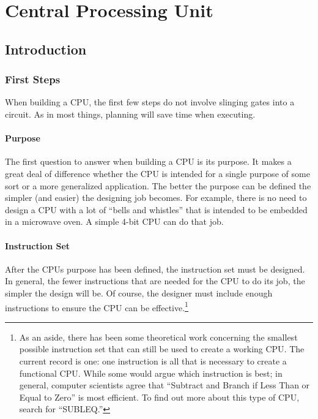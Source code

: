 \chapter{Central Processing Unit}\label{lab12}

\section{Introduction}

\subsection{First Steps}

When building a \ac{CPU}, the first few steps do not involve slinging gates into a circuit. As in most things, planning will save time when executing.

\subsubsection{Purpose}

The first question to answer when building a \ac{CPU} is its purpose. It makes a great deal of difference whether the \ac{CPU} is intended for a single purpose of some sort or a more generalized application. The better the purpose can be defined the simpler (and easier) the designing job becomes. For example, there is no need to design a \ac{CPU} with a lot of ``bells and whistles'' that is intended to be embedded in a microwave oven. A simple 4-bit \ac{CPU} can do that job.

\subsubsection{Instruction Set}

After the \acp{CPU} purpose has been defined, the instruction set must be designed. In general, the fewer instructions that are needed for the \ac{CPU} to do its job, the simpler the design will be. Of course, the designer must include enough instructions to ensure the \ac{CPU} can be effective.\footnote{As an aside, there has been some theoretical work concerning the smallest possible instruction set that can still be used to create a working \ac{CPU}. The current record is one: one instruction is all that is necessary to create a functional \ac{CPU}. While some would argue which instruction is best; in general, computer scientists agree that ``Subtract and Branch if Less Than or Equal to Zero'' is most efficient. To find out more about this type of \ac{CPU}, search for ``SUBLEQ.''}

